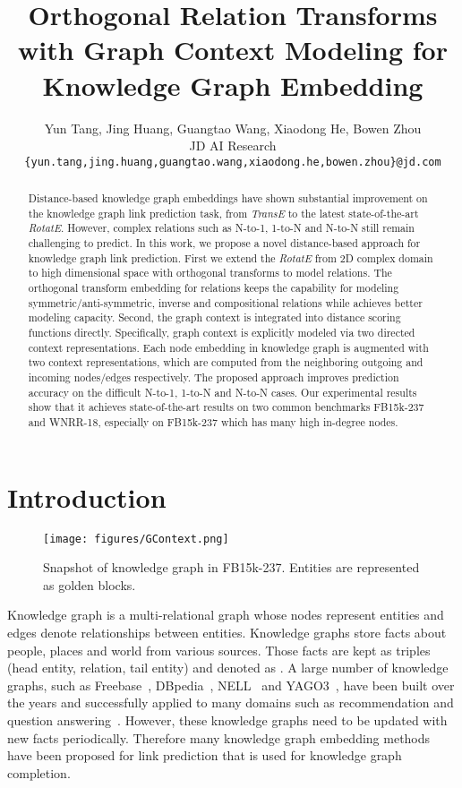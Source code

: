 \documentclass[11pt,a4paper]{article}
\title{Orthogonal Relation Transforms with Graph Context Modeling for Knowledge Graph Embedding}
\author{Yun Tang,  Jing Huang, Guangtao Wang, Xiaodong He, Bowen Zhou \\
  JD AI Research \\
  \texttt{\small\{yun.tang,jing.huang,guangtao.wang,xiaodong.he,bowen.zhou\}@jd.com} \\
}
\date{}
\begin{document}
\maketitle
\begin{abstract}
Distance-based knowledge graph embeddings have shown substantial improvement on the knowledge graph link prediction task, from {\em TransE} to the latest state-of-the-art {\em RotatE}. However, complex relations such as N-to-1, 1-to-N and N-to-N still remain challenging to predict. 
In this work, we propose a novel distance-based approach 
for knowledge graph link prediction. First we extend the {\em RotatE} from 2D complex domain to high dimensional space with orthogonal transforms to model relations. The orthogonal transform embedding for relations keeps the capability for modeling symmetric/anti-symmetric, inverse and compositional relations while achieves better modeling capacity. 
Second, the graph context is integrated into distance scoring functions directly. 
Specifically, graph context is explicitly modeled via two directed context representations. Each node embedding in knowledge graph is augmented with two context representations, which are computed from the neighboring outgoing and incoming nodes/edges respectively. 
The proposed approach improves prediction accuracy on the difficult N-to-1, 1-to-N and N-to-N cases. Our experimental results show that it achieves state-of-the-art results on two common benchmarks FB15k-237 and WNRR-18,
especially on FB15k-237 which has many high in-degree nodes.
\end{abstract}

\section{Introduction}\label{sec:intr}

\begin{figure*}[!ht]
    \centering
    \texttt{[image: figures/GContext.png]}
    \caption{Snapshot of knowledge graph in FB15k-237. Entities are represented as golden blocks. }
    \label{fig:kg}
\end{figure*} 

Knowledge graph is a multi-relational graph whose nodes represent entities and edges denote relationships between entities. 
Knowledge graphs store facts about people, places and world from various sources. Those facts are kept as triples (head entity, relation, tail entity) and denoted as .
A large number of knowledge graphs, such as Freebase~\cite{bollacker2008freebase}, DBpedia~\cite{auer2007dbpedia}, NELL~\cite{carlson2010toward} and YAGO3~\cite{mahdisoltani2013yago3}, have been built over the years and successfully applied to many domains such as recommendation and question answering~\cite{Bordes2014QuestionAW,Zhang2016CollaborativeKB}.
However, these knowledge graphs need to be updated with new facts periodically.
Therefore many knowledge graph embedding methods have been proposed for link prediction that is used for knowledge graph completion.
\end{document}
